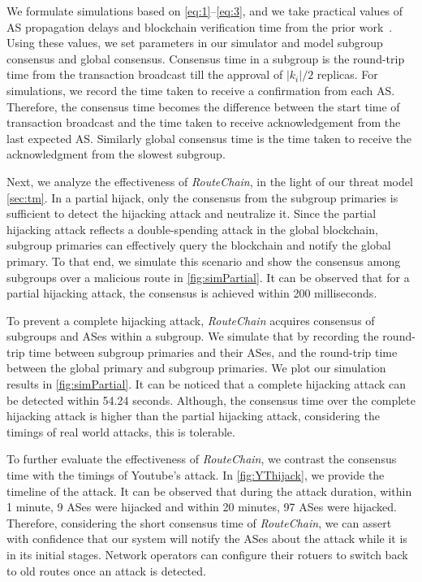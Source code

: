 \documentclass[conference]{IEEEtran}
\newcommand{\rc}{{{\em RouteChain}}\xspace}
\begin{document}
We formulate simulations based on \autoref{eq:1}--\autoref{eq:3}, and we take practical values of AS propagation delays and blockchain verification time from the prior work~\cite{LabovitzABJ01,TakahashiEII15,pazmino2015}. Using these values, we set parameters in our simulator and model subgroup consensus and global consensus. Consensus time in a subgroup is the round-trip time from the transaction broadcast till the approval of $|k_{i}|/2$ replicas. For simulations, we record the time taken to receive a confirmation from each AS. Therefore, the consensus time becomes the difference between the start time of transaction broadcast and the time taken to receive acknowledgement from the last expected AS. Similarly global consensus time is the time taken to receive the acknowledgment from the slowest subgroup. 


Next, we analyze the effectiveness of \rc, in the light of our threat model \textsection\ref{sec:tm}. In a  partial hijack, only the consensus from the subgroup primaries is sufficient to detect the hijacking attack and neutralize it. Since the partial hijacking attack reflects a double-spending attack in the global blockchain, subgroup primaries can effectively query the blockchain and notify the global primary. To that end, we simulate this scenario and show the consensus among subgroups over a malicious route in \autoref{fig:simPartial}. It can be observed that for a partial hijacking attack, the consensus is achieved within 200 milliseconds. 

To prevent a complete hijacking attack, \rc acquires consensus of subgroups and ASes within a subgroup. We simulate that by recording the round-trip time between subgroup primaries and their ASes, and the round-trip time between the global primary and subgroup primaries. We plot our simulation results in \autoref{fig:simPartial}. It can be noticed that a complete hijacking attack can be detected within 54.24 seconds. Although, the consensus time over the complete hijacking attack is higher than the partial hijacking attack, considering the timings of real world attacks, this is tolerable. 

To further evaluate the effectiveness of \rc, we contrast the consensus time with the timings of Youtube's attack. In \autoref{fig:YThijack}, we provide the timeline of the attack. It can be observed that during the attack duration, within 1 minute, 9 ASes were hijacked and within 20 minutes, 97 ASes were hijacked. Therefore, considering the short consensus time of \rc, we can assert with confidence that our system will notify the ASes about the attack while it is in its initial stages. Network operators can configure their rotuers to switch back to old routes once an attack is detected. 
\end{document}
